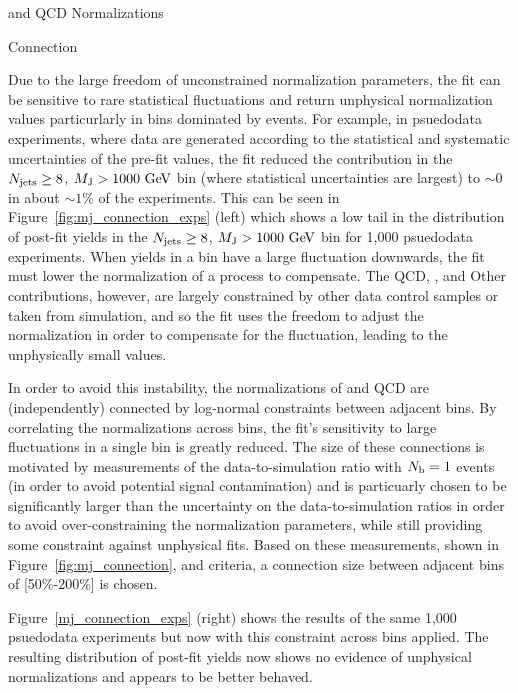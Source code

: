 \begin{section}{\ttbar and QCD Normalizations}
\begin{subsection}{\MJ Connection}

Due to the large freedom of unconstrained normalization parameters, the fit can be sensitive to rare statistical fluctuations and return unphysical normalization values particurlarly in bins dominated by \ttbar events.
For example, in psuedodata experiments, where data are generated according to the statistical and systematic uncertainties of the pre-fit values, the fit reduced the \ttbar contribution in the $N_{\mathrm{jets}} \geq 8$, $M_\mathrm{J} > 1000~\mathrm{Ge\kern -0.1em V}$ bin (where statistical uncertainties are largest) to $\sim0$ in about $\sim1\%$ of the experiments.
This can be seen in Figure~\ref{fig:mj_connection_exps} (left) which shows a low tail in the distribution of post-fit \ttbar yields in the $N_{\mathrm{jets}} \geq 8$, $M_\mathrm{J} > 1000~\mathrm{Ge\kern -0.1em V}$ bin for 1,000 psuedodata experiments.
When yields in a bin have a large fluctuation downwards, the fit must lower the normalization of a process to compensate.
The QCD, \Wjets, and Other contributions, however, are largely constrained by other data control samples or taken from simulation, and so the fit uses the freedom to adjust the \ttbar normalization in order to compensate for the fluctuation, leading to the unphysically small values.

In order to avoid this instability, the normalizations of \ttbar and QCD are (independently) connected by log-normal constraints between adjacent \MJ bins.
By correlating the normalizations across \MJ bins, the fit's sensitivity to large fluctuations in a single bin is greatly reduced.
The size of these connections is motivated by measurements of the data-to-simulation ratio with $N_\mathrm{b} = 1$ events (in order to avoid potential signal contamination) and is particuarly chosen to be significantly larger than the uncertainty on the data-to-simulation ratios in order to avoid over-constraining the normalization parameters, while still providing some constraint against unphysical fits.
Based on these measurements, shown in Figure~\ref{fig:mj_connection}, and criteria, a connection size between adjacent bins of [50\%-200\%] is chosen.

Figure~\ref{mj_connection_exps} (right) shows the results of the same 1,000 psuedodata experiments but now with this constraint across \MJ bins applied.
The resulting distribution of post-fit \ttbar yields now shows no evidence of unphysical normalizations and appears to be better behaved.


\end{subsection}
\end{section}
